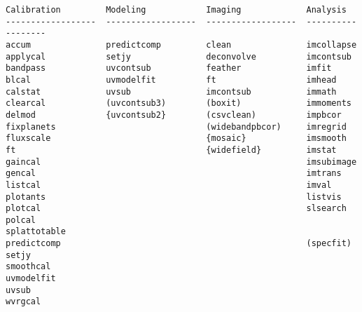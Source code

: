 \begin{verbatim}
Calibration         Modeling            Imaging             Analysis          
------------------  ------------------  ------------------  ------------------
accum               predictcomp         clean               imcollapse        
applycal            setjy               deconvolve          imcontsub         
bandpass            uvcontsub           feather             imfit             
blcal               uvmodelfit          ft                  imhead            
calstat             uvsub               imcontsub           immath            
clearcal            (uvcontsub3)        (boxit)             immoments         
delmod              {uvcontsub2}        (csvclean)          impbcor           
fixplanets                              (widebandpbcor)     imregrid          
fluxscale                               {mosaic}            imsmooth          
ft                                      {widefield}         imstat            
gaincal                                                     imsubimage        
gencal                                                      imtrans           
listcal                                                     imval             
plotants                                                    listvis           
plotcal                                                     slsearch          
polcal                                                      splattotable      
predictcomp                                                 (specfit)         
setjy                                                                         
smoothcal                                                                     
uvmodelfit                                                                    
uvsub                                                                         
wvrgcal                                                                       


\end{verbatim}
